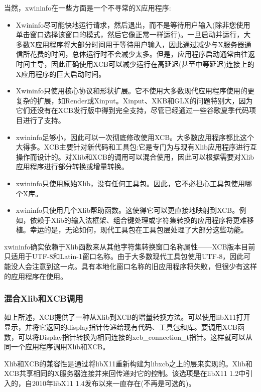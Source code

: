 \noindent 当然，xwininfo在一些方面是一个不寻常的X应用程序:

\begin{itemize}
	\item Xwininfo尽可能快地运行请求，然后退出，而不是等待用户输入(除非您使用单击窗口选择该窗口的模式，然后它像正常一样运行)。一旦启动并运行，大多数X应用程序将大部分时间用于等待用户输入，因此通过减少与X服务器通信所花费的时间，总体运行时不会减少太多。但是，应用程序启动通常由往返时间主导，因此正确使用XCB可以减少运行在高延迟(甚至中等延迟)连接上的X应用程序的巨大启动时间。
	
	\item Xwininfo只使用核心协议和形状扩展。它不使用大多数现代应用程序使用的更复杂的扩展，如Render或Xinput。Xinput、XKB和GLX的问题特别大，因为它们还没有在XCB发行版中得到完全支持，尽管已经通过一些谷歌夏季代码项目进行了支持。
	
	\item xwininfo足够小，因此可以一次彻底修改使用XCB。大多数应用程序都比这个大得多。XCB主要针对新代码和工具包:它是专门为与现有Xlib应用程序进行互操作而设计的。对Xlib和XCB的调用可以混合使用，因此可以根据需要对Xlib应用程序进行部分转换或增量转换。
	
	\item xwininfo只使用原始Xlib，没有任何工具包。因此，它不必担心工具包使用哪个X库。
	
	\item xwininfo只使用几个Xlib帮助函数。这使得它可以更直接地映射到XCB。例如，依赖于Xlib的输入法框架、组合键处理或字符集转换的应用程序将更难移植。幸运的是，无论如何，现代工具包在工具包层处理了大部分这些功能。
\end{itemize}

xwininfo确实依赖于Xlib函数来从其他字符集转换窗口名称属性——XCB版本目前只适用于UTF-8和Latin-1窗口名称。由于大多数现代工具包使用UTF-8，因此可能没人会注意到这一点。具有本地化窗口名称的旧应用程序将失败，但很少有这样的应用程序在使用。

\subsubsection{混合Xlib和XCB调用}

如上所述，XCB提供了一种从Xlib到XCB的增量转换方法。可以使用libX11打开显示，并将它返回的display指针传递给现有代码、工具包和库。要调用XCB函数，可以将Display指针转换为相同连接的xcb\_connection\_t指针。这样就可以从同一个应用程序调用Xlib和XCB。

Xlib和XCB的兼容性是通过将libX11重新构建为libxcb之上的层来实现的。Xlib和XCB共享相同的X服务器连接并来回传递对它的控制。该选项是在libX11 1.2中引入的，自2010年libX11 1.4发布以来一直存在(不再是可选的)。

